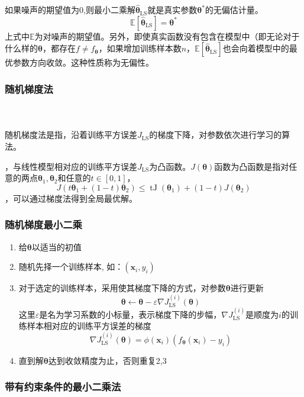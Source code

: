 \documentclass{beamer}
\newcommand{\tmmathbf}[1]{\ensuremath{\boldsymbol{#1}}}
\newcommand{\tmop}[1]{\ensuremath{\operatorname{#1}}}
\newenvironment{enumeratenumeric}{\begin{enumerate}[1.] }{\end{enumerate}}
\begin{document}
\begin{CJK*}{UTF8}{gbsn}
{{\begin{frame}
  如果噪声的期望值为0,则最小二乘解$\hat{\tmmathbf{\theta}}_{\tmop{LS}}$就是真实参数$\tmmathbf{\theta}^{\ast}$的无偏估计量。
  \[ \mathbb{E} [\hat{\tmmathbf{\theta}}_{\tmop{LS}}]
     =\tmmathbf{\theta}^{\ast} \]
  上式中$\mathbb{E}$为对噪声的期望值。另外，即使真实函数没有包含在模型中（即无论对于什么样的$\tmmathbf{\theta}$，都存在$f
  \neq f_{\tmmathbf{\theta}}$，如果增加训练样本数$n$，$\mathbb{E}
  [\hat{\tmmathbf{\theta}}_{\tmop{LS}}]$也会向着模型中的最优参数方向收敛。这种性质称为无偏性。
\end{frame}}{\begin{frame}
  \frametitle{随机梯度法}
  
  \qquad{}
\end{frame}}{\begin{frame}
  \frametitle{}
  
  \
  
  随机梯度法是指，沿着训练平方误差$J_{\tmop{LS}}$的梯度下降，对参数依次进行学习的算法。
  
  ，与线性模型相对应的训练平方误差$J_{\tmop{LS}}$为凸函数。$J
  (\tmmathbf{\theta})$函数为凸函数是指对任意的两点$\tmmathbf{\theta}_1,
  \tmmathbf{\theta}_2$和任意的$t \in [0, 1]$，
  \[ J (t\tmmathbf{\theta}_1 + (1 - t) \tmmathbf{\theta}_2) \leqslant
     \tmop{tJ} (\tmmathbf{\theta}_1) + (1 - t) J (\tmmathbf{\theta}_2) \]
  ，可以通过梯度法得到全局最优解。
\end{frame}}{\begin{frame}
  \frametitle{}
  
\end{frame}}{\begin{frame}
  \frametitle{随机梯度最小二乘}
  
  \begin{enumeratenumeric}
    \item 给$\tmmathbf{\theta}$以适当的初值
    
    \item 随机先择一个训练样本, 如：$(\tmmathbf{x}_i, y_i)$
    
    \item
    对于选定的训练样本，采用使其梯度下降的方式，对参数$\tmmathbf{\theta}$进行更新
    \[ \tmmathbf{\theta} \leftarrow \tmmathbf{\theta}- \varepsilon \nabla
       J_{\tmop{LS}}^{(i)} (\tmmathbf{\theta}) \]
    这里$\varepsilon$是名为学习系数的小标量，表示梯度下降的步幅，$\nabla
    J_{\tmop{LS}}^{(i)}$是顺度为$i$的训练样本相对应的训练平方误差的梯度
    \[ \nabla J_{\tmop{LS}}^{(i)} (\tmmathbf{\theta}) = \phi (\tmmathbf{x}_i)
       (f_{\tmmathbf{\theta}} (\tmmathbf{x}_i) - y_i) \]
    \item
    直到解$\tmmathbf{\theta}$达到收敛精度为止，否则重复2,3
  \end{enumeratenumeric}
\end{frame}}{\begin{frame}
  \frametitle{带有约束条件的最小二乘法}
  

\end{frame}}}
\end{CJK*}
\end{document}
